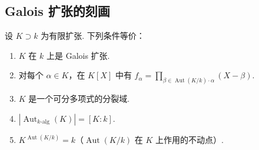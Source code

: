 \subsection{Galois 扩张的刻画}\label{sec:galois-2-7-2}
\begin{theorem*}设 $K\supset k$ 为有限扩张. 下列条件等价：
\begin{enumerate}[label=\roman*)]
\item $K$ 在 $k$ 上是 Galois 扩张.
\item 对每个 $\alpha\in K$，在 $K[X]$ 中有 $f_\alpha=\prod_{\beta\in\operatorname{Aut}(K/k)\cdot\alpha}(X-\beta)$.
\item $K$ 是一个可分多项式的分裂域.
\item $|\operatorname{Aut}_{k\text{-alg}}(K)|=[K:k]$.
\item $K^{\operatorname{Aut}(K/k)}=k$（$\operatorname{Aut}(K/k)$ 在 $K$ 上作用的不动点）.
\end{enumerate}\end{theorem*}
